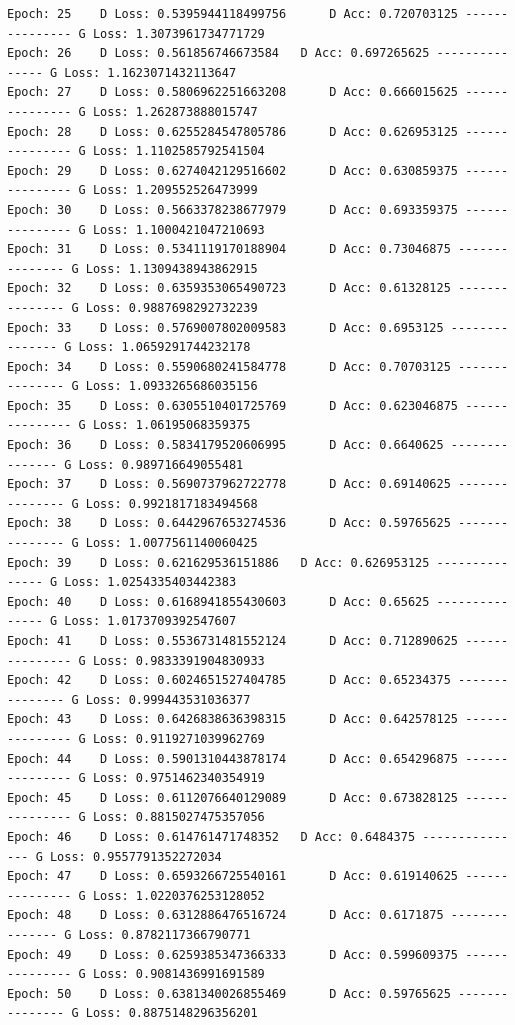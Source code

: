 \documentclass[11pt]{article}
\begin{document}
\begin{Verbatim}[commandchars=\\\{\}]
Epoch: 25 	 D Loss: 0.5395944118499756 	 D Acc: 0.720703125 --------------- G Loss: 1.3073961734771729
Epoch: 26 	 D Loss: 0.561856746673584 	 D Acc: 0.697265625 --------------- G Loss: 1.1623071432113647
Epoch: 27 	 D Loss: 0.5806962251663208 	 D Acc: 0.666015625 --------------- G Loss: 1.262873888015747
Epoch: 28 	 D Loss: 0.6255284547805786 	 D Acc: 0.626953125 --------------- G Loss: 1.1102585792541504
Epoch: 29 	 D Loss: 0.6274042129516602 	 D Acc: 0.630859375 --------------- G Loss: 1.209552526473999
Epoch: 30 	 D Loss: 0.5663378238677979 	 D Acc: 0.693359375 --------------- G Loss: 1.1000421047210693
Epoch: 31 	 D Loss: 0.5341119170188904 	 D Acc: 0.73046875 --------------- G Loss: 1.1309438943862915
Epoch: 32 	 D Loss: 0.6359353065490723 	 D Acc: 0.61328125 --------------- G Loss: 0.9887698292732239
Epoch: 33 	 D Loss: 0.5769007802009583 	 D Acc: 0.6953125 --------------- G Loss: 1.0659291744232178
Epoch: 34 	 D Loss: 0.5590680241584778 	 D Acc: 0.70703125 --------------- G Loss: 1.0933265686035156
Epoch: 35 	 D Loss: 0.6305510401725769 	 D Acc: 0.623046875 --------------- G Loss: 1.06195068359375
Epoch: 36 	 D Loss: 0.5834179520606995 	 D Acc: 0.6640625 --------------- G Loss: 0.989716649055481
Epoch: 37 	 D Loss: 0.5690737962722778 	 D Acc: 0.69140625 --------------- G Loss: 0.9921817183494568
Epoch: 38 	 D Loss: 0.6442967653274536 	 D Acc: 0.59765625 --------------- G Loss: 1.0077561140060425
Epoch: 39 	 D Loss: 0.621629536151886 	 D Acc: 0.626953125 --------------- G Loss: 1.0254335403442383
Epoch: 40 	 D Loss: 0.6168941855430603 	 D Acc: 0.65625 --------------- G Loss: 1.0173709392547607
Epoch: 41 	 D Loss: 0.5536731481552124 	 D Acc: 0.712890625 --------------- G Loss: 0.9833391904830933
Epoch: 42 	 D Loss: 0.6024651527404785 	 D Acc: 0.65234375 --------------- G Loss: 0.999443531036377
Epoch: 43 	 D Loss: 0.6426838636398315 	 D Acc: 0.642578125 --------------- G Loss: 0.9119271039962769
Epoch: 44 	 D Loss: 0.5901310443878174 	 D Acc: 0.654296875 --------------- G Loss: 0.9751462340354919
Epoch: 45 	 D Loss: 0.6112076640129089 	 D Acc: 0.673828125 --------------- G Loss: 0.8815027475357056
Epoch: 46 	 D Loss: 0.614761471748352 	 D Acc: 0.6484375 --------------- G Loss: 0.9557791352272034
Epoch: 47 	 D Loss: 0.6593266725540161 	 D Acc: 0.619140625 --------------- G Loss: 1.0220376253128052
Epoch: 48 	 D Loss: 0.6312886476516724 	 D Acc: 0.6171875 --------------- G Loss: 0.8782117366790771
Epoch: 49 	 D Loss: 0.6259385347366333 	 D Acc: 0.599609375 --------------- G Loss: 0.9081436991691589
Epoch: 50 	 D Loss: 0.6381340026855469 	 D Acc: 0.59765625 --------------- G Loss: 0.8875148296356201

\end{Verbatim}
\end{document}
